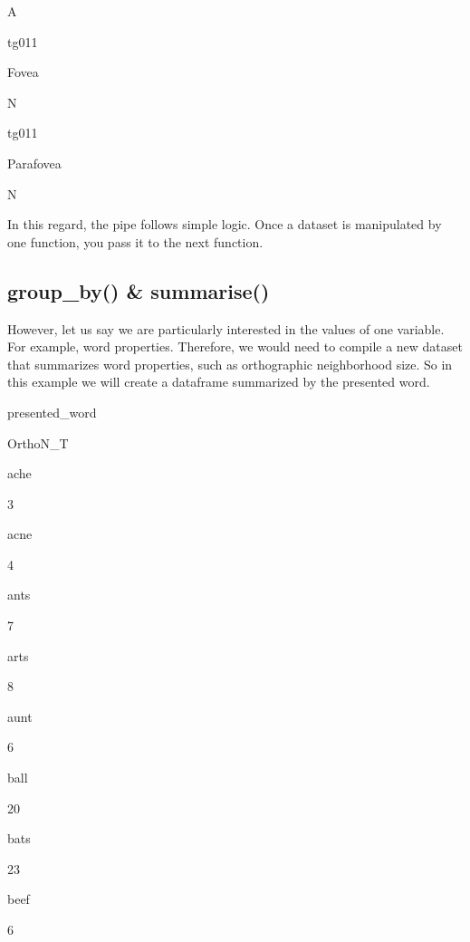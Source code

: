 \documentclass[]{book}
\newenvironment{Shaded}{\begin{snugshade}}{\end{snugshade}}
\newcommand{\KeywordTok}[1]{\textcolor[rgb]{0.13,0.29,0.53}{\textbf{#1}}}
\newcommand{\DataTypeTok}[1]{\textcolor[rgb]{0.13,0.29,0.53}{#1}}
\newcommand{\StringTok}[1]{\textcolor[rgb]{0.31,0.60,0.02}{#1}}
\newcommand{\OperatorTok}[1]{\textcolor[rgb]{0.81,0.36,0.00}{\textbf{#1}}}
\newcommand{\NormalTok}[1]{#1}
\begin{document}
A

tg011

Fovea

N

tg011

Parafovea

N

In this regard, the pipe follows simple logic. Once a dataset is
manipulated by one function, you pass it to the next function.

\subsection{group\_by() \& summarise()}\label{group_by-summarise}

However, let us say we are particularly interested in the values of one
variable. For example, word properties. Therefore, we would need to
compile a new dataset that summarizes word properties, such as
orthographic neighborhood size. So in this example we will create a
dataframe summarized by the presented word.

\begin{Shaded}
\end{Shaded}

presented\_word

OrthoN\_T

ache

3

acne

4

ants

7

arts

8

aunt

6

ball

20

bats

23

beef

6
\end{document}

